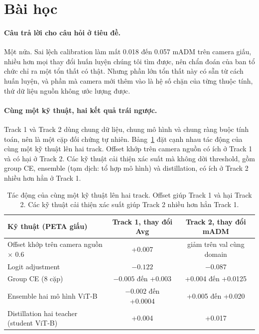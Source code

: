 \documentclass[11pt,a4paper]{article}
\begin{document}
\section{Bài học}
\label{sec:lessons}

\paragraph{Câu trả lời cho câu hỏi ở tiêu đề.} Một nửa. Sai lệch calibration làm mất 0.018 đến 0.057 mADM trên camera giấu, nhiều hơn mọi thay đổi huấn luyện chúng tôi tìm được, nên chẩn đoán của ban tổ chức chỉ ra một tổn thất có thật. Nhưng phần lớn tổn thất này có sẵn từ cách huấn luyện, và phần mà camera mới thêm vào là hệ số chặn của từng thuộc tính, thứ dữ liệu nguồn không ước lượng được.

\paragraph{Cùng một kỹ thuật, hai kết quả trái ngược.} Track 1 và Track 2 dùng chung dữ liệu, chung mô hình và chung ràng buộc tính toán, nên là một cặp đối chứng tự nhiên. Bảng~\ref{tab:t1t2} đặt cạnh nhau tác động của cùng một kỹ thuật lên hai track. Offset khớp trên camera nguồn có ích ở Track 1 và có hại ở Track 2. Các kỹ thuật cải thiện xác suất mà không dời threshold, gồm group CE, ensemble (tạm dịch: tổ hợp mô hình) và distillation, có ích ở Track 2 nhiều hơn hẳn ở Track 1.

\begin{table}[H]
\centering\small
\begin{tabularx}{\linewidth}{@{}Xcc@{}}
\toprule
Kỹ thuật (PETA giấu) & Track 1, thay đổi Avg & Track 2, thay đổi mADM \\
\midrule
Offset khớp trên camera nguồn × 0.6 & +0.007 & giảm trên val cùng domain \\
Logit adjustment & $-0.122$ & $-0.087$ \\
Group CE (8 cặp) & $-0.005$ đến +0.003 & +0.004 đến +0.0125 \\
Ensemble hai mô hình ViT-B & $-0.002$ đến +0.0004 & +0.005 đến +0.020 \\
Distillation hai teacher (student ViT-B) & +0.004 & +0.017 \\
\bottomrule
\end{tabularx}
\caption{Tác động của cùng một kỹ thuật lên hai track. Offset giúp Track 1 và hại Track 2. Các kỹ thuật cải thiện xác suất giúp Track 2 nhiều hơn hẳn Track 1.}
\label{tab:t1t2}
\end{table}
\end{document}

